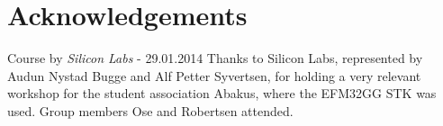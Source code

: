 \chapter{Acknowledgements}
Course by \textit{Silicon Labs} - 29.01.2014
Thanks to Silicon Labs, represented by Audun Nystad Bugge and Alf Petter Syvertsen,
for holding a very relevant workshop for the student association Abakus, where the EFM32GG STK was used.
Group members Ose and Robertsen attended.
